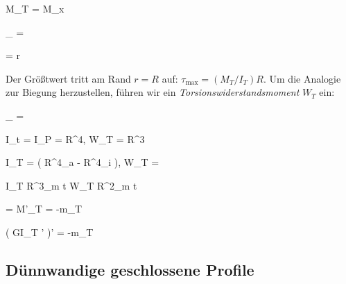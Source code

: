 \documentclass[11pt]{article}
\newcommand{\1}{ {\mathds{1}} }
\newcommand{\td}{\,\text{d}}
\begin{document}
\begin{multicols}{3}
		\begin{formel}{5.6}
			M_T = M_x
		\end{formel}
		\begin{formel}{5.7}
			\theta_{\ell} = 
		\end{formel}
		\begin{formel}{5.8}
			\tau = r
		\end{formel}

		\pagebreak[0]
		Der Größtwert tritt am Rand $ r = R $ auf: $ \tau_{\text{max}} = \left( M_T / I_T \right) R $.
		Um
die Analogie zur Biegung herzustellen, führen wir ein \textit{Torsionswiderstandsmoment} $ W_T $ ein:
		\nopagebreak

		\begin{formel}{5.9}
			\tau_{} = 
		\end{formel}
		\begin{formel}{5.10}
			I_t = I_P =  R^4, \quad W_T = R^3
		\end{formel}
		\begin{formel}{5.11}
			I_T =  \left( R^4_a - R^4_i \right), \quad W_T = 
		\end{formel}
		\begin{formel}{5.12}
			I_T  \pi R^3_m t \quad W_T  \pi R^2_m t
		\end{formel}
		\begin{formel}{5.13}
			\frac{\td M_T}{\td x} = M'_T = -m_T
		\end{formel}
		\begin{formel}{5.14}
			\left( GI_T \theta' \right)' = -m_T
		\end{formel}

		\subsection{Dünnwandige geschlossene Profile}


\end{multicols}
\end{document}
